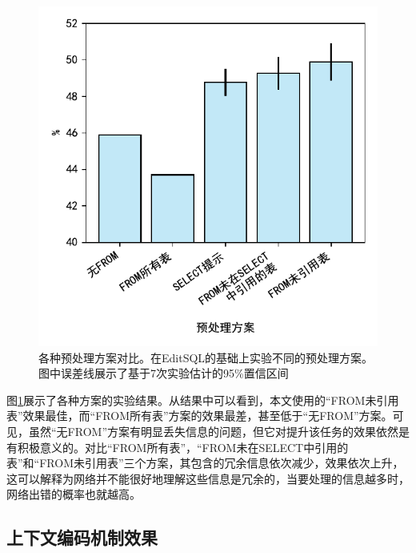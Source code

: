 \begin{figure}
    \centering
    \includegraphics{figure/preprocess.pdf}
    \caption{各种预处理方案对比。在EditSQL的基础上实验不同的预处理方案。图中误差线展示了基于7次实验估计的95\%置信区间}
    \label{preprocess-results}
\end{figure}

图\ref{preprocess-results}展示了各种方案的实验结果。从结果中可以看到，本文使用的“FROM未引用表”效果最佳，而“FROM所有表”方案的效果最差，甚至低于“无FROM”方案。可见，虽然“无FROM”方案有明显丢失信息的问题，但它对提升该任务的效果依然是有积极意义的。对比“FROM所有表”，“FROM未在SELECT中引用的表”和“FROM未引用表”三个方案，其包含的冗余信息依次减少，效果依次上升，这可以解释为网络并不能很好地理解这些信息是冗余的，当要处理的信息越多时，网络出错的概率也就越高。

\subsection{上下文编码机制效果}


